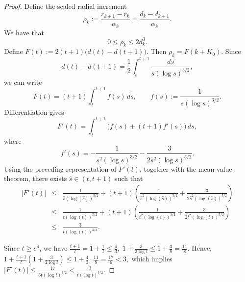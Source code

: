 \documentclass[11pt]{article}
\numberwithin{equation}{section}
\newcommand{\nn}{\nonumber}
\begin{document}
\begin{proof}
Define the scaled radial increment
\[
    \rho_k
    :=\frac{r_{k+1}-r_k}{\alpha_k}
    =\frac{d_k-d_{k+1}}{\alpha_k}.
\]
We have that
\begin{equation}
    0\leq \rho_k\leq 2d_k^3.
    \label{eq:app-rho-size}
\end{equation}
Define
$
    F(t):=2(t+1)\bigl(d(t)-d(t+1)\bigr).$
Then \(\rho_k=F(k+K_0)\).  Since
\[
    d(t)-d(t+1)
    =\frac12\int_t^{t+1}
      \frac{ds}{s(\log s)^{3/2}},
\]
we can write
\[
    F(t)=(t+1)\int_t^{t+1}f(s)\,ds,
    \qquad
    f(s):=\frac{1}{s(\log s)^{3/2}}.
\]
Differentiation gives
\[
    F'(t)
    =\int_t^{t+1}\bigl(f(s)+(t+1)f'(s)\bigr)\,ds,
\]
where
\[
    f'(s)
    =-\frac{1}{s^2(\log s)^{3/2}}
     -\frac{3}{2s^2(\log s)^{5/2}}.
\]
Using the preceding representation of $F'(t)$, together with the mean-value theorem, there exists $\widehat s\in(t,t+1)$ such that
\begin{eqnarray*}
|F'(t)|
&\leq& \frac{1}{\widehat s(\log(\widehat s))^{3/2}}
+(t+1)\left(\frac{1}{\widehat s^2(\log(\widehat s))^{3/2}}
+\frac{3}{2\widehat s^2(\log(\widehat s))^{5/2}}\right)\nn\\
&\leq&\frac{1}{t(\log(t))^{3/2}}
+(t+1)\left(\frac{1}{t^2(\log(t))^{3/2}}
+\frac{3}{2t^2(\log(t))^{5/2}}\right)\nn\\
&\leq&\frac{3}{t(\log(t))^{3/2}}.
\end{eqnarray*}

Since \(t\ge e^{4}\), we have
$
\frac{t+1}{t}
=1+\frac1t
\le
\frac43,
\;
1+\frac{3}{2\log t}
\le
1+\frac38
=
\frac{11}{8}.$
Hence,
$
1+\frac{t+1}{t}
\left(
1+\frac{3}{2\log t}
\right)
\le
1+\frac43\cdot\frac{11}{8}
=
\frac{17}{6}
<
3,
$
which implies
$
|F'(t)|
\le
\frac{17}{6t(\log t)^{3/2}}
<
\frac{3}{t(\log t)^{3/2}}.
$


\end{proof}
\end{document}
